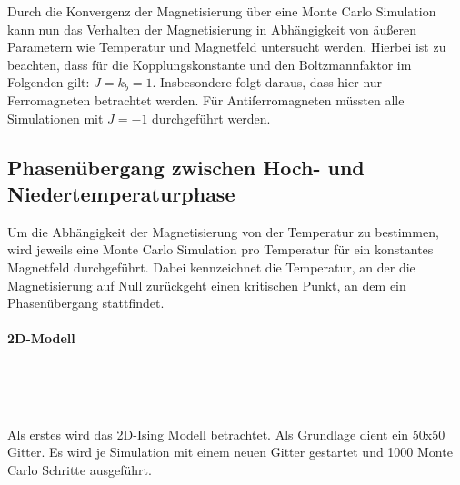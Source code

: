 
Durch die Konvergenz der Magnetisierung über eine Monte Carlo Simulation kann nun das Verhalten der Magnetisierung in Abhängigkeit von äußeren Parametern wie Temperatur und Magnetfeld untersucht werden. Hierbei ist zu beachten, dass für die Kopplungskonstante und den Boltzmannfaktor im Folgenden gilt: $J=k_{b}=1$. Insbesondere folgt daraus, dass hier nur Ferromagneten betrachtet werden. Für Antiferromagneten müssten alle Simulationen mit $J=-1$ durchgeführt werden.


\subsection{Phasenübergang zwischen Hoch- und Niedertemperaturphase}
\label{auswT}

Um die Abhängigkeit der Magnetisierung von der Temperatur zu bestimmen, wird jeweils eine Monte Carlo Simulation pro Temperatur für ein konstantes Magnetfeld durchgeführt. Dabei kennzeichnet die Temperatur, an der die Magnetisierung auf Null zurückgeht einen kritischen Punkt, an dem ein Phasenübergang stattfindet.


\paragraph{2D-Modell}

\

\

Als erstes wird das 2D-Ising Modell betrachtet. Als Grundlage dient ein 50x50 Gitter. Es wird je Simulation mit einem neuen Gitter gestartet und 1000 Monte Carlo Schritte ausgeführt. 


